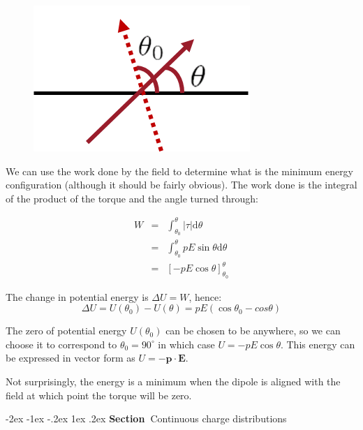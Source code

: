 \documentclass[
]{book}
\makeatletter
\renewcommand\section{%
\@startsection{section}{1}{\z@}%
              {-2ex \@plus -1ex \@minus -.2ex}%
              {1ex \@plus .2ex}%
              {\sffamily\bfseries\large\noindent Section~}}
\makeatother
\begin{document}
\begin{figure}

{\centering \includegraphics[width=0.7\linewidth]{Figures/dipole_align} 

}

\caption{ }\label{fig:dipoleAlign}
\end{figure}

We can use the work done by the field to determine what is the minimum
energy configuration (although it should be fairly obvious). The work
done is the integral of the product of the torque and the angle turned
through:

\begin{equation}
\label{eq:workDone}
\begin{array}{rcll}
W &=& \int_{\theta_0}^{\theta} |\tau| \mathrm{d}\theta \\
&=& \int_{\theta_0}^{\theta} pE \sin\theta \mathrm{d}\theta \\ 
&=& [-pE \cos\theta]_{\theta_0}^{\theta}
\end{array}
\end{equation}

The change in potential energy is \(\Delta U = W\), hence:
\begin{equation}
\label{eq:changeEpot}
\Delta U = U(\theta_0) - U(\theta) = pE(\cos⁡\theta_0 - cos\theta)
\end{equation}

The zero of potential energy \(U(\theta_0)\) can be chosen to be anywhere,
so we can choose it to correspond to \(\theta_0 = 90^{\circ}\) in which
case \(U = -pE \cos\theta\). This energy can be expressed in vector form
as \(U = - \mathbf{p} \cdot \mathbf{E}\).

Not surprisingly, the energy is a minimum when the dipole is aligned
with the field at which point the torque will be zero.

\hypertarget{continuous-charge-distributions}{%
\section{Continuous charge distributions}\label{continuous-charge-distributions}}
\end{document}
